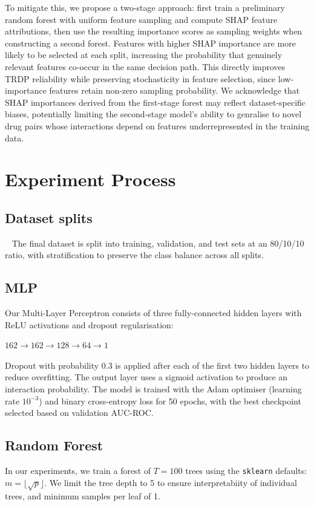 \documentclass[letterpaper]{article} %
\begin{document}
To mitigate this, we propose a two-stage approach: first train a preliminary random forest with uniform feature sampling and compute SHAP feature attributions, then use the resulting importance scores as sampling weights when constructing a second forest. Features with higher SHAP importance are more likely to be selected at each split, increasing the probability that genuinely relevant features co-occur in the same decision path. This directly improves TRDP reliability while preserving stochasticity in feature selection, since low-importance features retain non-zero sampling probability. We acknowledge that SHAP importances derived from the first-stage forest may reflect dataset-specific biases, potentially limiting the second-stage model's ability to genralise to novel drug pairs whose interactions depend on features underrepresented in the training data.

\section{Experiment Process}

\subsection{Dataset splits}
\ 
\newline
The final dataset is split into training, validation, and test sets at an 80/10/10 ratio, with stratification to preserve the class balance across all splits.
\subsection{MLP}
Our Multi-Layer Perceptron consists of three fully-connected hidden layers with ReLU activations and dropout regularisation:

\begin{center}
    $162 \rightarrow 162 \rightarrow 128 \rightarrow 64 \rightarrow 1$
\end{center}
Dropout with probability 0.3 is applied after each of the first two hidden layers to reduce overfitting. The output layer uses a sigmoid activation to produce an interaction probability. The model is trained with the Adam optimiser (learning rate $10^{-3}$) and binary cross-entropy loss for 50 epochs, with the best checkpoint selected based on validation AUC-ROC.

\subsection{Random Forest}
 In our experiments, we train a forest of $T = 100$ trees using the \texttt{sklearn} defaults: $m = \lfloor\sqrt{p}\rfloor$. We limit the tree depth to 5 to ensure interpretabiity of individual trees, and minimum samples per leaf of 1.
\end{document}
